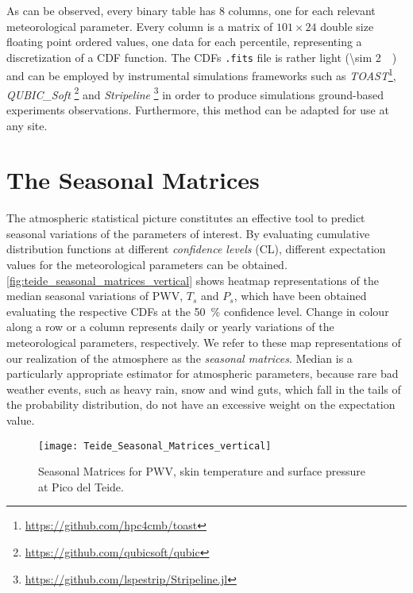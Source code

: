 As can be observed, every binary table has \num{8} columns, one for each
relevant meteorological parameter. Every column is a matrix of $101 \times
24$ double size floating point ordered values, one data for each
percentile, representing a discretization of a CDF function.  The CDFs
\texttt{.fits} file is rather light (\SI{\sim 2}{\mega\byte}) and can be
employed by instrumental simulations frameworks such as
\emph{TOAST}\footnote{\url{https://github.com/hpc4cmb/toast}},
\emph{QUBIC\_Soft} \footnote{\url{https://github.com/qubicsoft/qubic}} and
\emph{Stripeline}
\footnote{\url{https://github.com/lspestrip/Stripeline.jl}} in order to
produce simulations ground-based experiments observations. Furthermore,
this method can be adapted for use at any site.

\section{The Seasonal Matrices}

The atmospheric statistical picture constitutes an effective tool to
predict seasonal variations of the parameters of interest. By evaluating
cumulative distribution functions at different \emph{confidence levels}
(CL), different expectation values for the meteorological parameters can be
obtained. \autoref{fig:teide_seasonal_matrices_vertical} shows heatmap
representations of the median seasonal variations of PWV, $T_s$ and $P_s$,
which have been obtained evaluating the respective CDFs at the
\SI{50}{\percent} confidence level. Change in colour along a row
or a column represents daily or yearly variations of the meteorological
parameters, respectively. We refer to these map representations of our
realization of the atmosphere as the \emph{seasonal matrices}. Median
is a particularly appropriate estimator for atmospheric parameters, because
rare bad weather events, such as heavy rain, snow and wind guts, which
fall in the tails of the probability distribution, do not have an excessive
weight on the expectation value.


\begin{figure}
        \centering
        \texttt{[image: Teide\_Seasonal\_Matrices\_vertical]}
        \caption{Seasonal Matrices for PWV, skin temperature and surface
        pressure at Pico del Teide.}
        \label{fig:teide_seasonal_matrices_vertical}
\end{figure}

